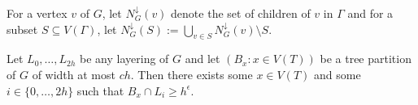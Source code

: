 \documentclass{patmorin}
\begin{document}
For a vertex $v$ of $G$, let $N^\downarrow_{G}(v)$ denote the set of children of $v$ in $\Gamma$ and for a subset $S\subseteq V(\Gamma)$, let $N^\downarrow_G(S):=\bigcup_{v\in S}N^\downarrow_G(v)\setminus S$.






\begin{lem}
  Let $L_0,\ldots,L_{2h}$ be any layering of $G$ and let $(B_x:x\in V(T))$ be a tree partition of $G$ of width at most $ch$.  Then there exists some $x\in V(T)$ and some $i\in\{0,\ldots,2h\}$ such that $B_x\cap L_i\ge h^{\epsilon}$.
\end{lem}
\end{document}
